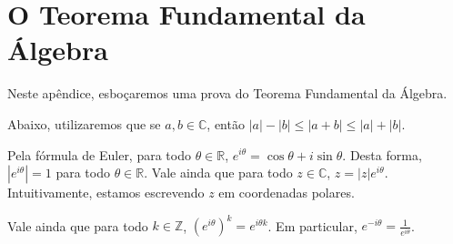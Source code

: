 \chapter{O Teorema Fundamental da Álgebra}

Neste apêndice, esboçaremos uma prova do Teorema Fundamental da Álgebra.

Abaixo, utilizaremos que se $a, b \in \mathbb C$, então $|a|-|b|\leq |a+b|\leq |a|+|b|$.

Pela fórmula de Euler, para todo $\theta \in \mathbb R$, $e^{i\theta}=\cos\theta+i\sin \theta$. Desta forma, $|e^{i\theta}|=1$ para todo $\theta \in \mathbb R$. Vale ainda que para todo $z \in \mathbb C$, $z=|z|e^{i\theta}$. Intuitivamente, estamos escrevendo $z$ em coordenadas polares.

 Vale ainda que para todo $k \in \mathbb Z$, $(e^{i\theta})^k=e^{i\theta k}$. Em particular, $e^{-i\theta}=\frac{1}{e^{i\theta}}$.
